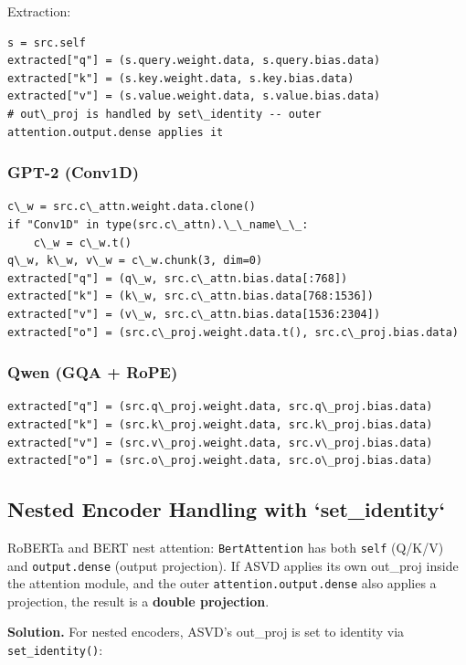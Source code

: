 Extraction:

\begin{lstlisting}
s = src.self
extracted["q"] = (s.query.weight.data, s.query.bias.data)
extracted["k"] = (s.key.weight.data, s.key.bias.data)
extracted["v"] = (s.value.weight.data, s.value.bias.data)
# out\_proj is handled by set\_identity -- outer attention.output.dense applies it
\end{lstlisting}

\subsubsection{GPT-2 (Conv1D)}

\begin{lstlisting}
c\_w = src.c\_attn.weight.data.clone()
if "Conv1D" in type(src.c\_attn).\_\_name\_\_:
    c\_w = c\_w.t()
q\_w, k\_w, v\_w = c\_w.chunk(3, dim=0)
extracted["q"] = (q\_w, src.c\_attn.bias.data[:768])
extracted["k"] = (k\_w, src.c\_attn.bias.data[768:1536])
extracted["v"] = (v\_w, src.c\_attn.bias.data[1536:2304])
extracted["o"] = (src.c\_proj.weight.data.t(), src.c\_proj.bias.data)
\end{lstlisting}

\subsubsection{Qwen (GQA + RoPE)}

\begin{lstlisting}
extracted["q"] = (src.q\_proj.weight.data, src.q\_proj.bias.data)
extracted["k"] = (src.k\_proj.weight.data, src.k\_proj.bias.data)
extracted["v"] = (src.v\_proj.weight.data, src.v\_proj.bias.data)
extracted["o"] = (src.o\_proj.weight.data, src.o\_proj.bias.data)
\end{lstlisting}

\subsection{Nested Encoder Handling with `set\_identity`}

RoBERTa and BERT nest attention: \texttt{BertAttention} has both \texttt{self} (Q/K/V) 
and \texttt{output.dense} (output projection). If ASVD applies its own out\_proj 
inside the attention module, and the outer \texttt{attention.output.dense} also 
applies a projection, the result is a \textbf{double projection}.

\textbf{Solution.} For nested encoders, ASVD's out\_proj is set to identity via 
\texttt{set\_identity()}:

